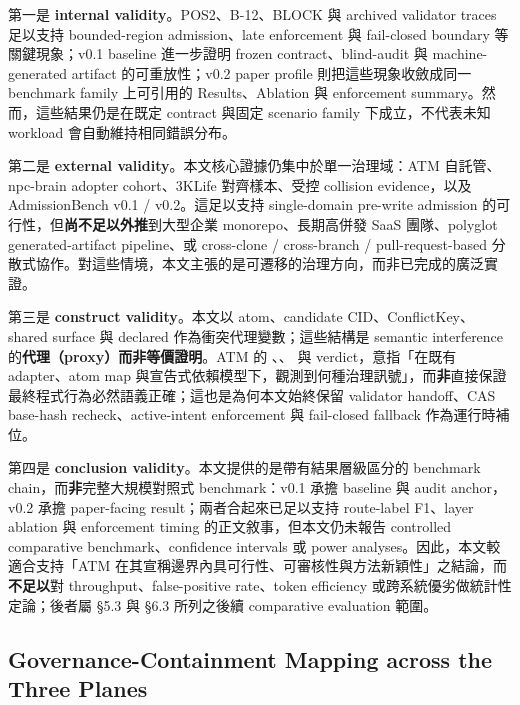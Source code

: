 \documentclass[a4paper,fontset=none]{ctexart}
\begin{document}
第一是 \textbf{internal validity}。POS2、B-12、BLOCK 與 archived validator traces 足以支持 bounded-region admission、late enforcement 與 fail-closed boundary 等關鍵現象；v0.1 baseline 進一步證明 frozen contract、blind-audit 與 machine-generated artifact 的可重放性；v0.2 paper profile 則把這些現象收斂成同一 benchmark family 上可引用的 Results、Ablation 與 enforcement summary。然而，這些結果仍是在既定 contract 與固定 scenario family 下成立，不代表未知 workload 會自動維持相同錯誤分布。

第二是 \textbf{external validity}。本文核心證據仍集中於單一治理域：ATM 自託管、npc-brain adopter cohort、3KLife 對齊樣本、受控 collision evidence，以及 AdmissionBench v0.1 / v0.2。這足以支持 single-domain pre-write admission 的可行性，但\textbf{尚不足以外推}到大型企業 monorepo、長期高併發 SaaS 團隊、polyglot generated-artifact pipeline、或 cross-clone / cross-branch / pull-request-based 分散式協作。對這些情境，本文主張的是可遷移的治理方向，而非已完成的廣泛實證。

第三是 \textbf{construct validity}。本文以 atom、candidate CID、ConflictKey、shared surface 與 declared \texttt{} 作為衝突代理變數；這些結構是 semantic interference 的\textbf{代理（proxy）而非等價證明}。ATM 的 \texttt{}、\texttt{}、\texttt{} 與 \texttt{} verdict，意指「在既有 adapter、atom map 與宣告式依賴模型下，觀測到何種治理訊號」，而\textbf{非}直接保證最終程式行為必然語義正確；這也是為何本文始終保留 validator handoff、CAS base-hash recheck、active-intent enforcement 與 fail-closed fallback 作為運行時補位。

第四是 \textbf{conclusion validity}。本文提供的是帶有結果層級區分的 benchmark chain，而\textbf{非}完整大規模對照式 benchmark：v0.1 承擔 baseline 與 audit anchor，v0.2 承擔 paper-facing result；兩者合起來已足以支持 route-label F1、layer ablation 與 enforcement timing 的正文敘事，但本文仍未報告 controlled comparative benchmark、confidence intervals 或 power analyses。因此，本文較適合支持「ATM 在其宣稱邊界內具可行性、可審核性與方法新穎性」之結論，而\textbf{不足以}對 throughput、false-positive rate、token efficiency 或跨系統優劣做統計性定論；後者屬 §5.3 與 §6.3 所列之後續 comparative evaluation 範圍。

\subsection{Governance-Containment Mapping across the Three Planes}
\end{document}
